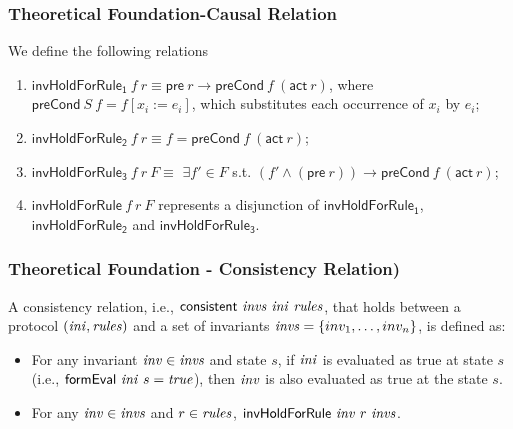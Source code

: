 \documentclass{beamer}
\begin{document}
\begin{frame}\frametitle{Theoretical Foundation-Causal Relation}
\begin{definition}
We define the following relations
\begin{enumerate}
\item $\mathsf{invHoldForRule_1} ~f ~r \equiv \mathsf{pre}~ r \longrightarrow \mathsf{preCond}~ f ~(\mathsf{act}~ r)$, where $\mathsf{preCond}~S~f=f[x_i:=e_i]$, which substitutes each
occurrence of $x_i$ by $e_i$;
\item $\mathsf{invHoldForRule_2}~ f~ r \equiv f = \mathsf{preCond}~ f~(\mathsf{act}~ r)$;
\item $\mathsf{invHoldForRule_3}~ f~ r ~F \equiv$  $\exists f' \in F$ s.t.
$(f' \wedge (\mathsf{pre}~ r)) \longrightarrow \mathsf{preCond} ~f ~(\mathsf{act}   ~r)$;
\item $\mathsf{invHoldForRule}~ f~ r ~F$ represents a disjunction of $\mathsf{invHoldForRule_1}$, $\mathsf{invHoldForRule_2}$
and $\mathsf{invHoldForRule_3}$.
\end{enumerate}
\end{definition}
\end{frame}

\begin{frame}\frametitle{Theoretical Foundation - Consistency Relation)}


\begin{definition}
A consistency relation, i.e., $\mathsf{consistent}~ {\it invs} ~{\it ini}~ {\it rules}$,
that holds between a protocol $({\it ini}, {\it rules})$ and
a set of invariants ${\it invs}=\{inv_1,\ldots, inv_n\}$,  is defined as:
%
\begin{itemize}
\item For any invariant ${\it inv} \in {\it invs}$ and state $s$,
if ${\it ini}$ is
evaluated as true at state $s$
(i.e., $\mathsf{formEval}~{\it ini}~s={\it true}$), then ${\it inv}$ is also evaluated as true at the state $s$.

\item For any ${\it inv} \in {\it invs}$ and $r\in {\it rules}$,
$\mathsf{invHoldForRule}~{\it inv}~r~{\it invs}$.
\end{itemize}
\end{definition}


\end{frame}
\end{document}
